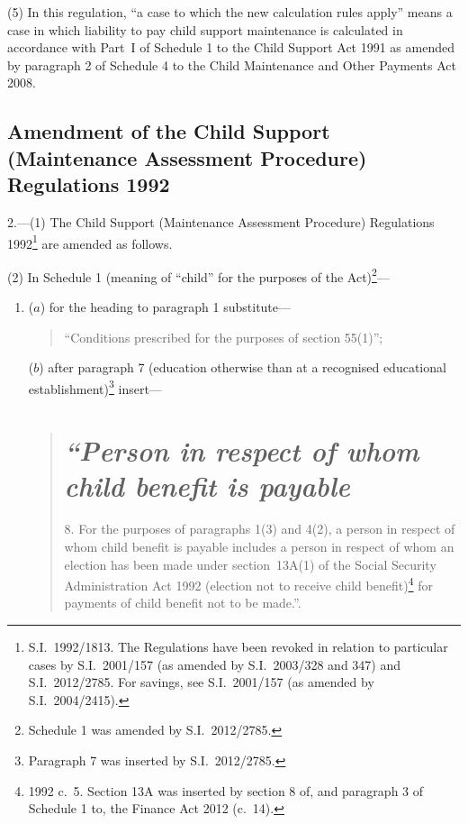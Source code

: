 \documentclass[12pt,a4paper]{article}
\begin{document}
(5) In this regulation, “a case to which the new calculation rules apply” means a case in which liability to pay child support maintenance is calculated in accordance with Part~I of Schedule 1 to the Child Support Act 1991 as amended by paragraph 2 of Schedule 4 to the Child Maintenance and Other Payments Act 2008.

\subsection[2. Amendment of the Child Support (Maintenance Assessment Procedure) Regulations 1992]{Amendment of the Child Support (Maintenance Assessment Procedure) Regulations 1992}

2.---(1)  The Child Support (Maintenance Assessment Procedure) Regulations 1992\footnote{S.I.~1992/1813. The Regulations have been revoked in relation to particular cases by S.I.~2001/157 (as amended by S.I.~2003/328 and 347) and S.I.~2012/2785. For savings, see S.I.~2001/157 (as amended by S.I.~2004/2415).} are amended as follows.

(2) In Schedule 1 (meaning of “child” for the purposes of the Act)\footnote{Schedule 1 was amended by S.I.~2012/2785.}—
\begin{enumerate}\item[]
($a$) for the heading to paragraph 1 substitute—
\begin{quotation}
“Conditions prescribed for the purposes of section 55(1)”;
\end{quotation}

($b$) after paragraph 7 (education otherwise than at a recognised educational establishment)\footnote{Paragraph 7 was inserted by S.I.~2012/2785.} insert—
\begin{quotation}
\section*{\itshape “Person in respect of whom child benefit is payable}

8.  For the purposes of paragraphs 1(3) and 4(2), a person in respect of whom child benefit is payable includes a person in respect of whom an election has been made under section~13A(1) of the Social Security Administration Act 1992 (election not to receive child benefit)\footnote{1992 c.~5. Section 13A was inserted by section 8 of, and paragraph 3 of Schedule 1 to, the Finance Act 2012 (c.~14).} for payments of child benefit not to be made.”.
\end{quotation}
\end{enumerate}
\end{document}
